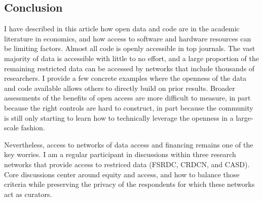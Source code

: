 \documentclass{Revue-economique}
\begin{document}
\begin{Article} [%
	Titre={Reproducibility and Open Science in Economics},
	Auteur={Lars Vilhuber\thanks{Cornell University, lars.vilhuber@cornell.edu}}]
\begin{refsection}[Main]
\section{Conclusion}

I have described in this article how open data and code are in the academic literature in economics, and how access to software and hardware resources can be limiting factors. Almost all code is openly accessible in top journals. The vast majority of data is accessible with little to no effort, and a large proportion of the remaining restricted data can be accessed by networks that include thousands of researchers. I provide a few concrete examples where the openness of the data and code available allows others to directly build on prior results. Broader assessments of the benefits of open access are more difficult to measure, in part because the right controls are hard to construct, in part because the community is still only starting to learn how to technically leverage the openness in a large-scale fashion.

Nevertheless, access to networks of data access and financing remains one of the key worries. I am a regular participant in discussions within three research networks that provide access to restriced data (\ac{FSRDC}, \ac{CRDCN}, and \ac{CASD}). Core discussions center around equity and access, and how to balance those criteria while preserving the privacy of the respondents for which these networks act as curators. 


\end{refsection}
\end{Article}
\end{document}
